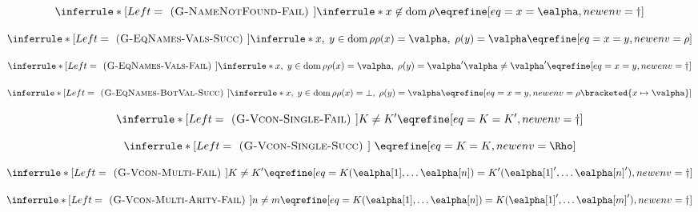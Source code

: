 \documentclass[]{article}
\DeclareMathOperator{\dom}{dom}
\begin{document}
\[
\inferrule*[Left=\textsc{ (G-NameNotFound-Fail) }]
    {\inferrule* {}
    {
    x \not\in \dom \rho
    }}
    {\eqrefine[eq={x = \ealpha},newenv=\dagger]}
\]

\[
\inferrule*[Left=\textsc{ (G-EqNames-Vals-Succ) }]
    {\inferrule* {}
    {
    x,\;y \in \dom \rho
    \\\\
    \rho(x) = \valpha, \; \rho(y) = \valpha
    }}
    {\eqrefine[eq={x = y},newenv=\rho]}
\]

\[
\inferrule*[Left=\textsc{ (G-EqNames-Vals-Fail) }]
    {\inferrule* {}
    {
    x,\;y \in \dom \rho
    \\\\
    \rho(x) = \valpha, \; \rho(y) = \valpha'
    \\\\
    \valpha \neq \valpha'}}
    {\eqrefine[eq={x = y},newenv=\dagger]}
\]


\[
\inferrule*[Left=\textsc{ (G-EqNames-BotVal-Succ) }]
    {\inferrule* {}
    {
    x,\;y \in \dom \rho
    \\\\
    \rho(x) = \bot, \; \rho(y) = \valpha
    }}
    {\eqrefine[eq={x = y},newenv=\rho\bracketed{x \mapsto \valpha}]}
\]

\[
\inferrule*[Left=\textsc{ (G-Vcon-Single-Fail) }]
    {K \neq K'}
    {\eqrefine[eq={K = K'}, newenv=\dagger]}
\]

\[
\inferrule*[Left=\textsc{ (G-Vcon-Single-Succ) }]
    {\ }
    {\eqrefine[eq={K = K}, newenv=\Rho]}
\]


\[
\inferrule*[Left=\textsc{ (G-Vcon-Multi-Fail) }]
    {K \neq K'}
    {\eqrefine[eq={K(\ealpha[1], \dots 
            \ealpha[n]) = K'(\ealpha[1]', \dots \ealpha[n]')},
            newenv=\dagger]}
\]

\[
\inferrule*[Left=\textsc{ (G-Vcon-Multi-Arity-Fail) }]
    {n \neq m}
    {\eqrefine[eq={K(\ealpha[1], \dots 
            \ealpha[n]) = K(\ealpha[1]', \dots \ealpha[m]')},
            newenv=\dagger]}
\]
\end{document}
